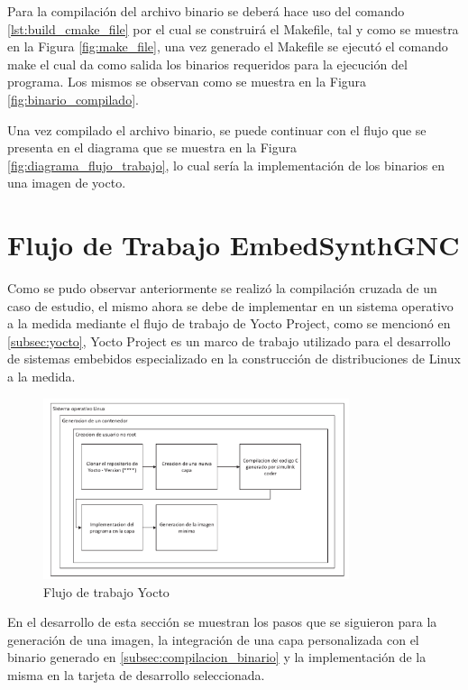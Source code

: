 Para la compilación del archivo binario se deberá hace uso del comando \ref{lst:build_cmake_file} por el cual se construirá el Makefile, tal y como se muestra en la Figura \ref{fig:make_file}, una vez generado el Makefile se ejecutó el comando make el cual da como salida los binarios requeridos para la ejecución del programa. Los mismos se observan como se muestra en la Figura \ref{fig:binario_compilado}.

Una vez compilado el archivo binario, se puede continuar con el flujo que se presenta en el diagrama que se muestra en la Figura \ref{fig:diagrama_flujo_trabajo}, lo cual sería la implementación de los binarios en una imagen de yocto.


\section{Flujo de Trabajo EmbedSynthGNC}

Como se pudo observar anteriormente se realizó la compilación cruzada de un caso de estudio, el mismo ahora se debe de implementar en un sistema operativo a la medida mediante el flujo de trabajo de Yocto Project, como se mencionó en \ref{subsec:yocto}, Yocto Project es un marco de trabajo utilizado para el desarrollo de sistemas embebidos especializado en la construcción de distribuciones de Linux a la medida. 

\begin{figure}[h!]
    \centering
    \includegraphics[width=0.8\textwidth]{fig/especifico_2/Flujo de trabajo de mi idea.pdf}
    \caption{Flujo de trabajo Yocto}
    \label{fig:flujo_yocto}
\end{figure}

En el desarrollo de esta sección se muestran los pasos que se siguieron para la generación de una imagen, la integración de una capa personalizada con el binario generado en \ref{subsec:compilacion_binario} y la implementación de la misma en la tarjeta de desarrollo seleccionada.

